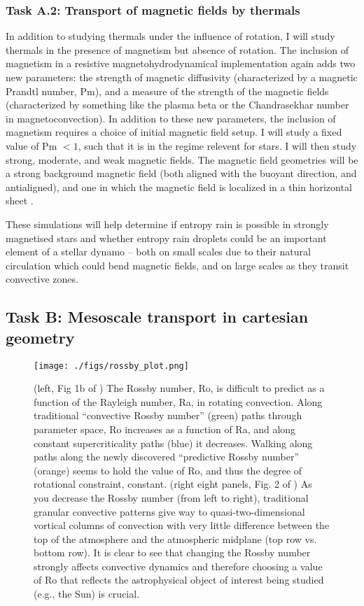 \documentclass[aasms,12pt]{article}
\begin{document}
\subsubsection{Task A.2: Transport of magnetic fields by thermals}
In addition to studying thermals under the influence of rotation, I will study thermals in the presence of magnetism but absence of rotation.
The inclusion of magnetism in a resistive magnetohydrodynamical implementation again adds two new parameters: the strength of magnetic diffusivity (characterized by a magnetic Prandtl number, Pm), and a measure of the strength of the magnetic fields (characterized by something like the plasma beta or the Chandrasekhar number in magnetoconvection).
In addition to these new parameters, the inclusion of magnetism requires a choice of initial magnetic field setup.
I will study a fixed value of Pm $< 1$, such that it is in the regime relevent for stars.
I will then study strong, moderate, and weak magnetic fields.
The magnetic field geometries will be a strong background magnetic field (both aligned with the buoyant direction, and antialigned), and one in which the magnetic field is localized in a thin horizontal sheet \citep[as in][]{tobias&all1998}.

These simulations will help determine if entropy rain is possible in strongly magnetised stars and whether entropy rain droplets could be an important element of a stellar dynamo -- both on small scales due to their natural circulation which could bend magnetic fields, and on large scales as they transit convective zones.

\subsection{Task B: Mesoscale transport in cartesian geometry}
\begin{figure*}[t!]
    \texttt{[image: ./figs/rossby\_plot.png]}
    \caption{(left, Fig 1b of \citet{anders&all2019}) The Rossby number, Ro, is difficult to predict as a function of the Rayleigh number, Ra, in rotating convection.
	Along traditional ``convective Rossby number'' (green) paths through parameter space, Ro increases as a function of Ra, and along constant supercriticality paths (blue) it decreases.
	Walking along paths along the newly discovered ``predictive Rossby number'' (orange) seems to hold the value of Ro, and thus the degree of rotational constraint, constant.
	(right eight panels, Fig. 2 of \citet{anders&all2019}) As you decrease the Rossby number (from left to right), traditional granular convective patterns give way to quasi-two-dimensional vortical columns of convection with very little difference between the top of the atmosphere and the atmospheric midplane (top row vs. bottom row).
	It is clear to see that changing the Rossby number strongly affects convective dynamics and therefore choosing a value of Ro that reflects the astrophysical object of interest being studied (e.g., the Sun) is crucial.
	\label{fig:rossby_plot} }
\end{figure*}
\end{document}
